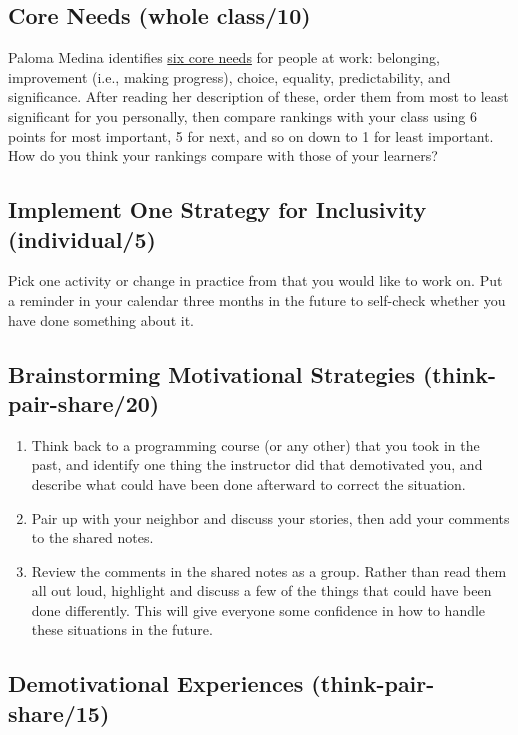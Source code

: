 \subsection*{Core Needs (whole class/10)}

Paloma Medina identifies \href{https://www.palomamedina.com/biceps}{six core needs} for people at
work: belonging, improvement (i.e., making progress), choice,
equality, predictability, and significance. After reading her
description of these, order them from most to least significant for
you personally, then compare rankings with your class using 6 points
for most important, 5 for next, and so on down to 1 for least
important. How do you think your rankings compare with those of your
learners?

\subsection*{Implement One Strategy for Inclusivity (individual/5)}

Pick one activity or change in practice from \cite{Lee2017} that you
would like to work on. Put a reminder in your calendar three months in
the future to self-check whether you have done something about it.

\subsection*{Brainstorming Motivational Strategies (think-pair-share/20)}

\begin{enumerate}
\item
  Think back to a programming course (or any other) that you took in
  the past, and identify one thing the instructor did that demotivated
  you, and describe what could have been done afterward to correct the
  situation.
\item
  Pair up with your neighbor and discuss your stories, then add your
  comments to the shared notes.
\item
  Review the comments in the shared notes as a group. Rather than read
  them all out loud, highlight and discuss a few of the things that
  could have been done differently. This will give everyone some
  confidence in how to handle these situations in the future.
\end{enumerate}

\subsection*{Demotivational Experiences (think-pair-share/15)}

